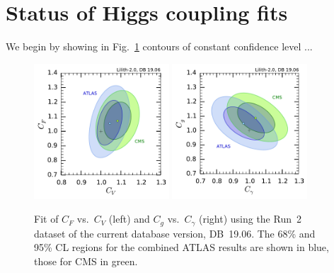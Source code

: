 \section{Status of Higgs coupling fits}

We begin by showing in Fig.~\ref{fig:rcfit-ATLAS-CMS} contours of constant confidence level ...

\begin{figure}[h!]\centering
\includegraphics[width=0.45\textwidth]{fits/CVCF_2d_ATLAS_CMS.pdf}%
\includegraphics[width=0.45\textwidth]{fits/CgCGa_2d_ATLAS_CMS.pdf}%
\vspace*{-2mm}
\caption{Fit of $C_F$ vs.\ $C_V$ (left) and $C_g$ vs.\ $C_\gamma$ (right) using the Run~2 dataset of the 
current database version, DB~19.06. The 68\% and 95\% CL regions for the combined ATLAS results 
are shown in blue, those for CMS in green.}
\label{fig:rcfit-ATLAS-CMS}
\end{figure}

